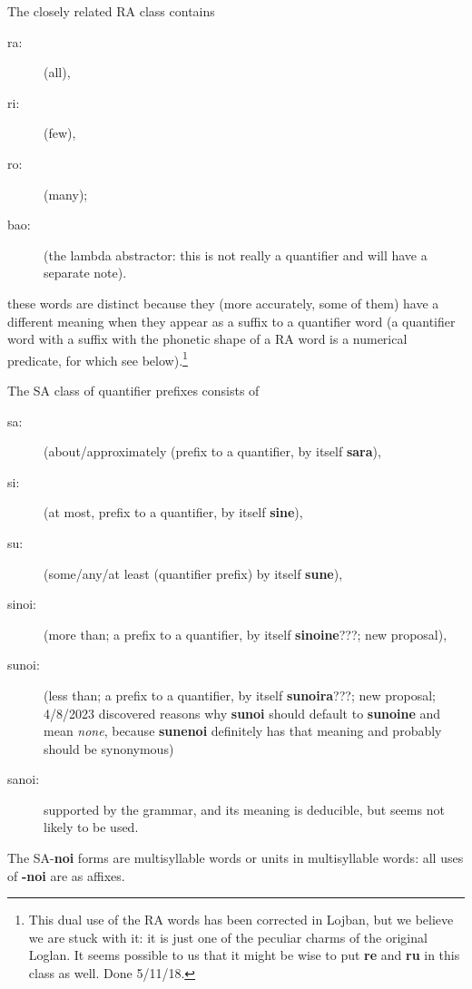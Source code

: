 \documentclass[12pt]{book}
\begin{document}
The closely related RA class contains 

\begin{description}

\item [ra:] (all), 

\item [ri:] (few), 

\item [ro:] (many);

\item[bao:]  (the lambda abstractor:  this is not really a quantifier and will have a separate note).

\end{description}

 these words are distinct because they (more accurately, some of them) have a different meaning when they appear as a suffix to a quantifier word (a quantifier word with a suffix with the phonetic shape of a RA word  is a numerical predicate, for which see below).\footnote{This dual use of the RA words has been corrected in Lojban, but we believe we are stuck with it:  it is just one of the peculiar charms of the original Loglan.  It seems possible to us that it might be wise to put {\bf re} and {\bf ru} in this class as well. Done 5/11/18.}

The SA class of quantifier prefixes consists of  \begin{description}
\item[sa:] (about/approximately (prefix to a quantifier, by itself {\bf sara}),  
\item[si:] (at most, prefix to a quantifier, by itself {\bf  sine}), 
\item[su:] (some/any/at least (quantifier prefix) by itself {\bf sune}),
\item[sinoi:]  (more than; a prefix to a quantifier, by itself {\bf sinoine}???; new proposal),
\item[sunoi:]  (less than; a prefix to a quantifier, by itself {\bf sunoira}???; new proposal;  4/8/2023 discovered reasons why {\bf sunoi} should default to {\bf sunoine} and mean {\em none\/}, because {\bf sunenoi} definitely has that meaning and probably should be synonymous)
\item[sanoi:]  supported by the grammar, and its meaning is deducible, but seems not likely to be used.\end{description}

The SA-{\bf noi} forms are multisyllable words or units in multisyllable words:  all uses of {\bf -noi} are as affixes.
\end{document}
